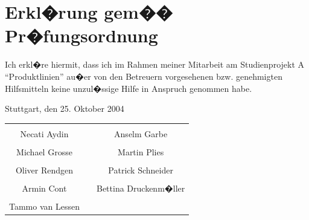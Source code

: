 \documentclass[a4paper,titlepage,12pt,ngerman]{scrbook}
\begin{document}
\chapter{Erkl�rung gem�� Pr�fungsordnung}

Ich erkl�re hiermit, dass ich im Rahmen meiner Mitarbeit am
Studienprojekt A ``Produktlinien'' au�er von den
Betreuern vorgesehenen bzw. genehmigten Hilfsmitteln keine unzul�ssige
Hilfe in Anspruch genommen habe.

\vspace{2cm}
Stuttgart, den 25. Oktober 2004
\vspace{2cm}

\begin{center}
\begin{tabular}{ccc}
  \hspace{5cm} & \hspace{5cm} & \hspace{5cm} \\
  \hhline{-~-} Necati Aydin & & Anselm Garbe \\
  \vspace{1,5cm} \\
  \hhline{-~-} Michael Grosse & & Martin Plies \\
  \vspace{1,5cm} \\
  \hhline{-~-} Oliver Rendgen & & Patrick Schneider \\
    \vspace{1,5cm} \\
  \hhline{-~-} Armin Cont & & Bettina Druckenm�ller \\
  \vspace{1,5cm} \\
  \hhline{-~~} Tammo van Lessen \\
\end{tabular}
\end{center}
\end{document}
